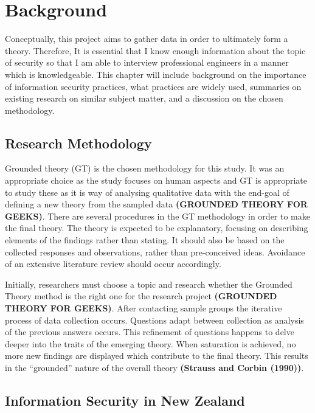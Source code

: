 \chapter{Background}\label{C:Background}

\par Conceptually, this project aims to gather data in order to ultimately form a theory. Therefore, It is essential that I know enough information about the topic of security so that I am able to interview professional engineers in a manner which is knowledgeable. This chapter will include background on the importance of information security practices, what practices are widely used, summaries on existing research on similar subject matter, and a discussion on the chosen methodology.  

\section{Research Methodology}

Grounded theory (GT) is the chosen methodology for this study. It was an appropriate choice as the study focuses on human aspects and GT is appropriate to study these as it is way of analysing qualitative data with the end-goal of defining a new theory from the sampled data \textbf{(GROUNDED THEORY FOR GEEKS)}. There are several procedures in the GT  methodology in order to make the final theory.  The theory is expected to be explanatory, focusing on describing elements of the findings rather than stating. It should also be based on the collected responses and observations, rather than pre-conceived ideas. Avoidance of an extensive literature review should occur accordingly.
\newline
\par Initially, researchers must choose a topic and research whether the Grounded Theory method is the right one for the research project \textbf{(GROUNDED THEORY FOR GEEKS)}. After contacting sample groups the iterative process of data collection occurs. Questions adapt between collection as analysis of the previous answers occurs. This refinement of questions happens to delve deeper into the traits of the emerging theory. When saturation is achieved, no more new findings are displayed which contribute to the final theory. This results in the “grounded” nature of the overall theory \textbf{(Strauss and Corbin (1990))}. 

\section{Information Security in New Zealand}

